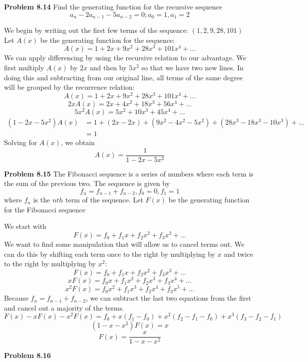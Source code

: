 \documentclass[11pt]{scrartcl}
\begin{document}
\begin{tcolorbox}
\textbf{Problem 8.14} Find the generating function for the recursive sequence 
$$a_{n}-2a_{n-1}-5a_{n-2}=0; a_{0}=1, a_{1}=2$$
\end{tcolorbox}
\noindent 
We begin by writing out the first few terms of the sequence: $(1,2,9,28,101)$ Let $A(x)$ be the generating function for the sequence: 
$$A(x)=1+2x+9x^2+28x^3+101x^4+...$$
We can apply differencing by using the recursive relation to our advantage. We first multiply $A(x)$ by $2x$ and then by $5x^2$ so that we have two new lines. In doing this and subtracting from our original line, all terms of the same degree will be grouped by the recurrence relation: 
$$A(x)=1+2x+9x^2+28x^3+101x^4+...$$
$$2xA(x)=2x+4x^2+18x^3+56x^4+...$$
$$5x^2A(x)=5x^2+10x^3+45x^4+...$$
\begin{align*}
    (1-2x-5x^2)A(x) &=1+(2x-2x)+(9x^2-4x^2-5x^2)+(28x^3-18x^3-10x^3)+...\\
    &=1
\end{align*}
Solving for $A(x)$, we obtain
$$A(x)=\frac{1}{1-2x-5x^2}$$
\begin{tcolorbox}
\textbf{Problem 8.15} The Fibonacci sequence is a series of numbers where each term is the sum of the previous two. The sequence is given by $${f_n}={f_{n-1}}+{f_{n-2}}, {f_0}=0, {{f_1}=1}$$ where $f_n$ is the $nth$ term of the sequence. Let $F(x)$ be the generating function for the Fibonacci sequence 
\end{tcolorbox}
\noindent 
We start with
$$F(x)={f_0}+{f_1}x+{f_2}x^2+{f_3}x^3+...$$
We want to find some manipulation that will allow us to cancel terms out. We can do this by shifting each term once to the right by multiplying by $x$ and twice to the right by multiplying by $x^2$: 
$$F(x)={f_0}+{f_1}x+{f_2}x^2+{f_3}x^3+...$$
$$xF(x)={f_0}x+{f_1}x^2+{f_2}x^3+{f_3}x^4+...$$
$$x^2F(x)={f_0}x^2+{f_1}x^3+{f_2}x^4+{f_3}x^5+...$$
Because ${f_n}={f_{n-1}}+{f_{n-2}}$, we can subtract the last two equations from the first and cancel out a majority of the terms. 
$$F(x)-xF(x)-x^2F(x)=f_0+x(f_1-f_0)+x^2(f_2-f_1-f_0)+x^3(f_3-f_2-f_1)$$
$$(1-x-x^2)F(x)=x$$
$$F(x)=\frac{x}{1-x-x^2}$$
\begin{tcolorbox}
\textbf{Problem 8.16} 
\end{tcolorbox}
\end{document}
